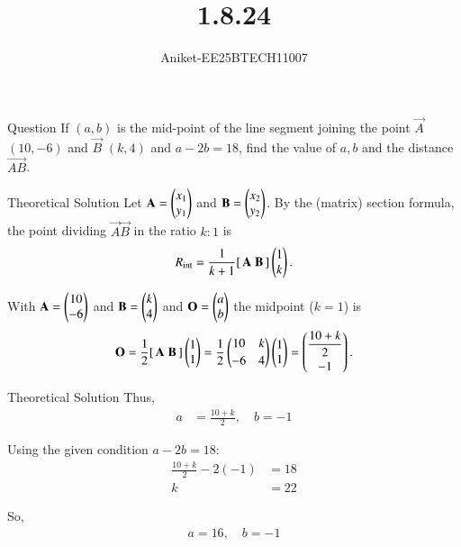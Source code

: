 \documentclass{beamer}
\title %
{1.8.24}
\author %
{Aniket-EE25BTECH11007}
\begin{document}
\frame{\titlepage}

\begin{frame}{Question}
If $(a,b)$ is the mid-point of the line segment joining the point 
$\vec{A}$ $(10,-6)$ and $\vec{B}$ $(k,4)$ and $a-2b=18$, find the value of $a,b$ and the distance $\vec{AB}$.\\
\end{frame}
\begin{frame}{Theoretical Solution}
Let
\(\mathbf{A}=\begin{pmatrix}x_1\\ y_1\end{pmatrix}\) and \(\mathbf{B}=\begin{pmatrix}x_2\\ y_2\end{pmatrix}\).
By the (matrix) section formula, the point dividing \(\vec{A}\vec{B}\) in the ratio \(k:1\) is
\begin{equation}
R_{\text{int}}=\frac{1}{k+1}[\,\mathbf{A}\;\mathbf{B}\,]\begin{pmatrix}1\\ k\end{pmatrix}.
\end{equation}

\medskip

With \(\mathbf{A}=\begin{pmatrix}10\\-6\end{pmatrix}\) and \(\mathbf{B}=\begin{pmatrix}k\\4\end{pmatrix}\) and \(\mathbf{O}=\begin{pmatrix}a\\b\end{pmatrix}\) the midpoint (\(k=1\)) is
\begin{equation}
\mathbf{O}=\frac12[\,\mathbf{A}\;\mathbf{B}\,]\begin{pmatrix}1\\1\end{pmatrix}
=\frac12\begin{pmatrix}10 & k\\[2pt] -6 & 4\end{pmatrix}\begin{pmatrix}1\\1\end{pmatrix}
=\begin{pmatrix}\dfrac{10+k}{2}\\[6pt]-1\end{pmatrix}.
\end{equation}

\end{frame}
\begin{frame}{Theoretical Solution}
Thus,
\begin{align}
a &= \frac{10+k}{2}, \quad b = -1 \tag{3}
\end{align}

Using the given condition $a - 2b = 18$:
\begin{align}
\frac{10+k}{2} - 2(-1) &= 18 \tag{4}\\
k &= 22 \tag{5}
\end{align}

So,
\begin{align}
a = \boxed{16}, \quad b = \boxed{-1} \tag{6}
\end{align}
\end{frame}
\end{document}

